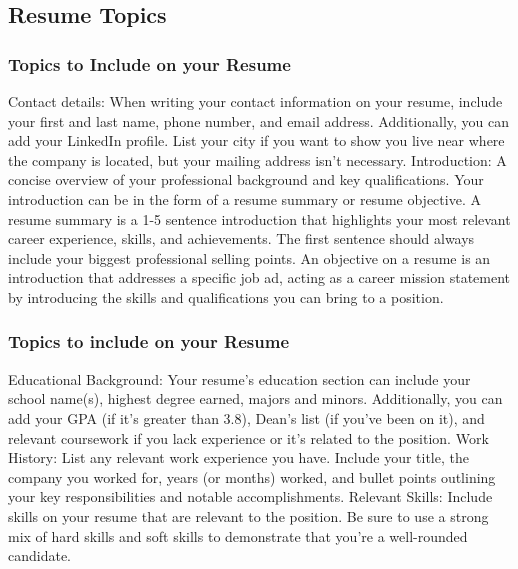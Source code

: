 \documentclass{beamer}
\begin{document}
\subsection{Resume Topics}
\begin{frame}
	\frametitle{Topics to Include on your Resume}
	\begin{outline}
		\1 Contact details: 
		\2 When writing your contact information on your resume, include your first and last name, phone number, and email address. 
		\2 Additionally, you can add your LinkedIn profile. 
		\2 List your city if you want to show you live near where the company is located, but your mailing address isn’t necessary.
		\1 Introduction: 
		\2 A concise overview of your professional background and key qualifications. 
		\2 Your introduction can be in the form of a resume summary or resume objective.
		\2 A resume summary is a 1-5 sentence introduction that highlights your most relevant career experience, skills, and achievements. 
		\3 The first sentence should always include your biggest professional selling points.
		\2 An objective on a resume is an introduction that addresses a specific job ad, acting as a career mission statement by introducing the skills and qualifications you can bring to a position.
	\end{outline}
\end{frame}

\begin{frame}
	\frametitle{Topics to include on your Resume}
	\begin{outline}
		\1 Educational Background: 
		\2 Your resume’s education section can include your school name(s), highest degree earned, majors and minors. 
		\2 Additionally, you can add your GPA (if it’s greater than 3.8), Dean’s list (if you’ve been on it), and relevant coursework if you lack experience or it’s related to the position.
		\1 Work History:  
		\2 List any relevant work experience you have. 
		\2 Include your title, the company you worked for, years (or months) worked, and bullet points outlining your key responsibilities and notable accomplishments.
		\1 Relevant Skills: 
		\2 Include skills on your resume that are relevant to the position. 
		\2 Be sure to use a strong mix of hard skills and soft skills to demonstrate that you’re a well-rounded candidate.
	\end{outline}
\end{frame}
\end{document}
